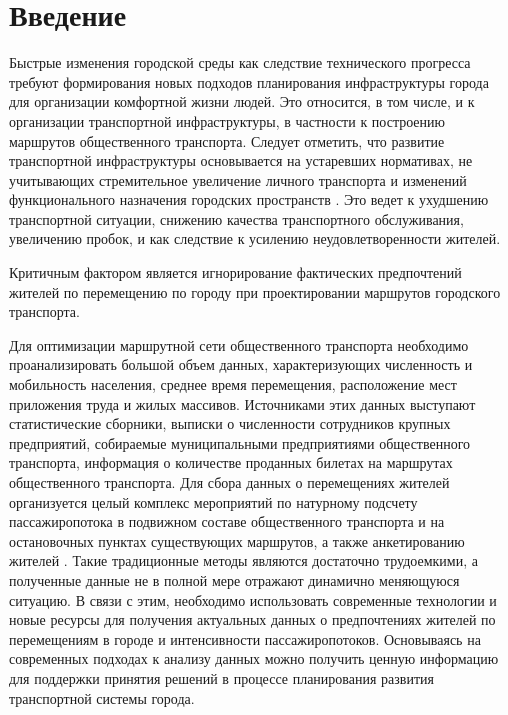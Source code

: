 \part{Введение}


Быстрые изменения городской среды как следствие технического прогресса требуют формирования новых 
подходов планирования инфраструктуры города для организации комфортной жизни людей. Это относится, в том 
числе, и к организации транспортной инфраструктуры, в частности к построению маршрутов общественного 
транспорта. Следует отметить, что развитие транспортной инфраструктуры основывается на устаревших 
нормативах, не учитывающих стремительное увеличение личного транспорта и изменений функционального 
назначения городских пространств \cite{bib:1}. Это ведет к ухудшению транспортной ситуации, снижению 
качества транспортного обслуживания, увеличению пробок, и как следствие к усилению неудовлетворенности 
жителей. 

Критичным фактором является игнорирование фактических предпочтений жителей по перемещению по городу при 
проектировании маршрутов городского транспорта.

Для оптимизации маршрутной сети общественного транспорта необходимо проанализировать большой объем данных, 
характеризующих численность и мобильность населения, среднее время перемещения, расположение мест приложения 
труда и жилых массивов. Источниками этих данных выступают статистические сборники, выписки о численности 
сотрудников крупных предприятий, собираемые муниципальными предприятиями общественного транспорта, 
информация о количестве проданных билетах на маршрутах общественного транспорта. Для сбора данных о 
перемещениях жителей организуется целый комплекс мероприятий по натурному подсчету пассажиропотока в 
подвижном составе общественного транспорта и на остановочных пунктах существующих маршрутов, а также 
анкетированию жителей \cite{bib:2,bib:3}. Такие традиционные методы являются достаточно трудоемкими, а 
полученные данные не в полной мере отражают динамично меняющуюся ситуацию. В связи с этим, необходимо 
использовать современные технологии и новые ресурсы для получения актуальных данных о предпочтениях жителей 
по перемещениям в городе и интенсивности пассажиропотоков. Основываясь на современных подходах к анализу 
данных можно получить ценную информацию для поддержки принятия решений в процессе планирования развития 
транспортной системы города. 

